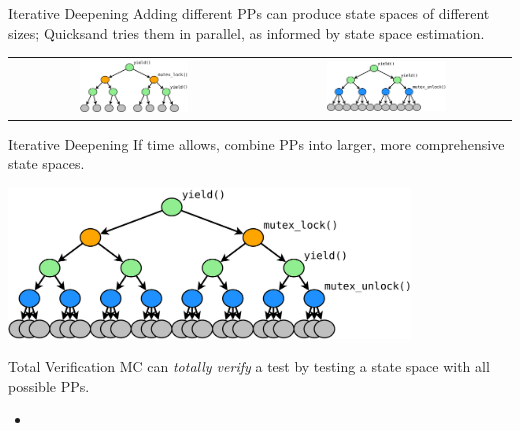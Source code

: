 \documentclass[xcolor=dvipsnames]{beamer}
\begin{document}
\begin{frame}{Iterative Deepening}
	Adding different PPs can produce state spaces of different sizes; Quicksand tries them in parallel, as informed by state space estimation.
	\vspace{0.15in}
	\begin{center}
		\begin{tabular}{cc}
			\includegraphics[width=0.45\textwidth]{tree1.pdf} &
			\includegraphics[width=0.5\textwidth]{tree2.pdf}
		\end{tabular}
	\end{center}
\end{frame}


\begin{frame}{Iterative Deepening}
	If time allows, combine PPs into larger, more comprehensive state spaces.
	\begin{center}
		\includegraphics[width=0.8\textwidth]{tree3.pdf}
	\end{center}
\end{frame}

\begin{frame}{Total Verification}
	MC can {\em totally verify} a test by testing a state space with all possible PPs.
	\begin{itemize}
		\item 
	\end{itemize}
\end{frame}
\end{document}
